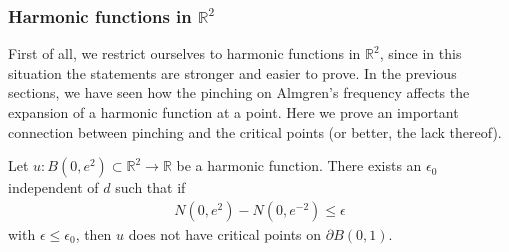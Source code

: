 \documentclass[11pt]{article}
\begin{document}
\subsubsection{Harmonic functions in ${\mathbb{R}}^2$} First of all, we restrict ourselves to harmonic functions in ${\mathbb{R}}^2$, since in this situation the statements are stronger and easier to prove. In the previous sections, we have seen how the pinching on Almgren's frequency affects the expansion of a harmonic function at a point. Here we prove an important connection between pinching and the critical points (or better, the lack thereof).
\begin{proposition}\label{prop_crit2}
 Let $u:B(0,e^2)\subset {\mathbb{R}}^2\to {\mathbb{R}}$ be a harmonic function. There exists an $\epsilon_0$ independent of $d$ such that if
 \begin{gather}
   N(0,e^2)-  N(0,e^{-2})\leq \epsilon
 \end{gather}
with $\epsilon \leq \epsilon_0$, then $u$ does not have critical points on $\partial B(0,1)$.
\end{proposition}
\end{document}
